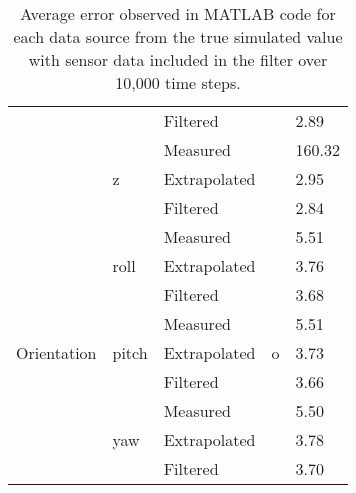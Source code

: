 \begin{table}[ht]
\begin{tabular}{@{}cllcl@{}}
                                              &                        & Filtered     &                           & 2.89          \\
                                              & \multirow{3}{*}{z}     & Measured     &                           & 160.32        \\
                                              &                        & Extrapolated &                           & 2.95          \\
                                              &                        & Filtered     &                           & 2.84          \\ \midrule
\multirow{9}{*}{Orientation}                  & \multirow{3}{*}{roll}  & Measured     & \multirow{9}{*}{o}        & 5.51          \\
                                              &                        & Extrapolated &                           & 3.76          \\
                                              &                        & Filtered     &                           & 3.68          \\
                                              & \multirow{3}{*}{pitch} & Measured     &                           & 5.51          \\
                                              &                        & Extrapolated &                           & 3.73          \\
                                              &                        & Filtered     &                           & 3.66          \\
                                              & \multirow{3}{*}{yaw}   & Measured     &                           & 5.50          \\
                                              &                        & Extrapolated &                           & 3.78          \\
                                              &                        & Filtered     &                           & 3.70          \\ \midrule
\end{tabular}
\caption{Average error observed in MATLAB code for each data source from the true simulated value with sensor data included in the filter over 10,000 time steps.}
\label{tab:rawvalues}
\end{table}

